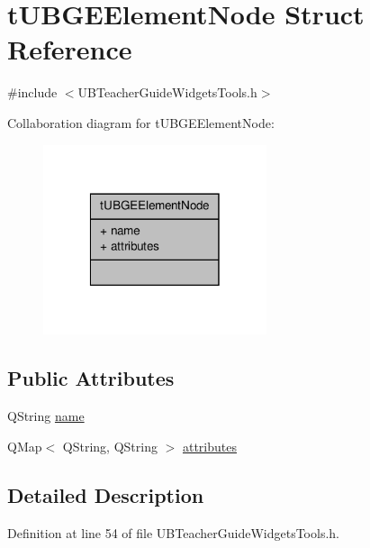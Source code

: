 \hypertarget{structt_u_b_g_e_element_node}{\section{t\-U\-B\-G\-E\-Element\-Node Struct Reference}
\label{dc/d4a/structt_u_b_g_e_element_node}
}


{\ttfamily \#include $<$U\-B\-Teacher\-Guide\-Widgets\-Tools.\-h$>$}



Collaboration diagram for t\-U\-B\-G\-E\-Element\-Node\-:
\nopagebreak
\begin{figure}[H]
\begin{center}
\leavevmode
\includegraphics[width=186pt]{dd/d37/structt_u_b_g_e_element_node__coll__graph}
\end{center}
\end{figure}
\subsection*{Public Attributes}
\begin{DoxyCompactItemize}
\item 
Q\-String \hyperlink{structt_u_b_g_e_element_node_a889b0141b125b4440cde206ba57d9c8a}{name}
\item 
Q\-Map$<$ Q\-String, Q\-String $>$ \hyperlink{structt_u_b_g_e_element_node_a09864b0527ab656ef8f468aed230aaa8}{attributes}
\end{DoxyCompactItemize}


\subsection{Detailed Description}


Definition at line 54 of file U\-B\-Teacher\-Guide\-Widgets\-Tools.\-h.



